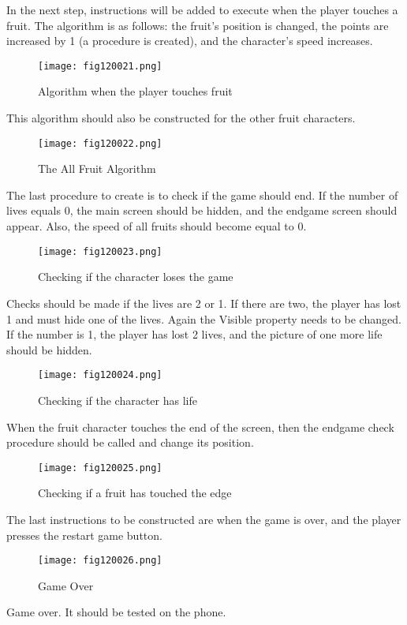 In the next step, instructions will be added to execute when the player touches a fruit. The algorithm is as follows: the fruit's position is changed, the points are increased by 1 (a procedure is created), and the character's speed increases.

\begin{figure}[H]
   \centering
   \texttt{[image: fig120021.png]}
   \caption{Algorithm when the player touches fruit}
\label{fig120021}
\end{figure}

This algorithm should also be constructed for the other fruit characters.

\begin{figure}[H]
   \centering
   \texttt{[image: fig120022.png]}
   \caption{The All Fruit Algorithm}
\label{fig120022}
\end{figure}

The last procedure to create is to check if the game should end. If the number of lives equals 0, the main screen should be hidden, and the endgame screen should appear. Also, the speed of all fruits should become equal to 0.

\begin{figure}[H]
   \centering
   \texttt{[image: fig120023.png]}
   \caption{Checking if the character loses the game}
\label{fig120023}
\end{figure}

Checks should be made if the lives are 2 or 1. If there are two, the player has lost 1 and must hide one of the lives. Again the Visible property needs to be changed. If the number is 1, the player has lost 2 lives, and the picture of one more life should be hidden.

\begin{figure}[H]
   \centering
   \texttt{[image: fig120024.png]}
   \caption{Checking if the character has life}
\label{fig120024}
\end{figure}

When the fruit character touches the end of the screen, then the endgame check procedure should be called and change its position.

\begin{figure}[H]
   \centering
   \texttt{[image: fig120025.png]}
   \caption{Checking if a fruit has touched the edge}
\label{fig120025}
\end{figure}

The last instructions to be constructed are when the game is over, and the player presses the restart game button.

\begin{figure}[H]
   \centering
   \texttt{[image: fig120026.png]}
   \caption{Game Over}
\label{fig120026}
\end{figure}

Game over. It should be tested on the phone.
